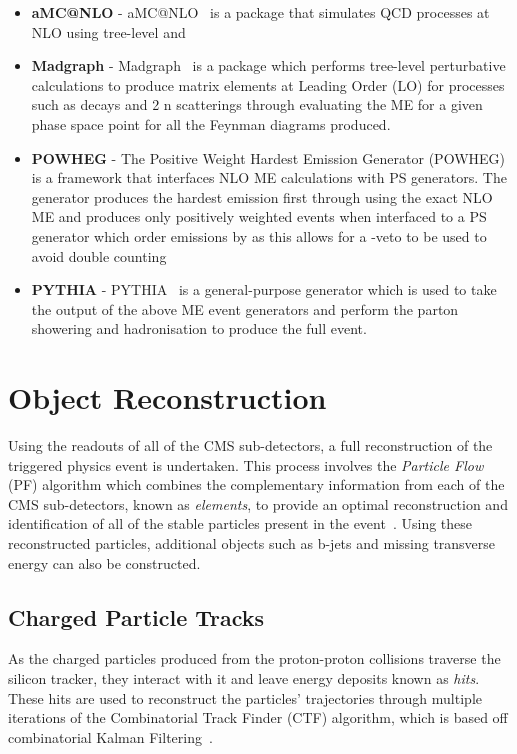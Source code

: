 \begin{itemize}
\item \textbf{aMC@NLO} - aMC@NLO~\cite{Alwall:2014hca} is a package that simulates QCD processes at NLO using tree-level and 	
\item \textbf{Madgraph} - Madgraph~\cite{Alwall:2011uj} is a package which performs tree-level perturbative calculations to produce matrix elements at Leading Order (LO) for processes such as decays and 2 \rightarrow n scatterings through evaluating the ME for a given phase space point for all the Feynman diagrams produced.
\item \textbf{POWHEG} - The Positive Weight Hardest Emission Generator (POWHEG)~\cite{Alioli:2010xd} is a framework that interfaces NLO ME calculations with PS generators.
The generator produces the hardest emission first through using the exact NLO ME and produces only positively weighted events 
when interfaced to a PS generator which order emissions by \pT as this allows for a \pT -veto to be used to avoid double counting 

\item \textbf{PYTHIA} - PYTHIA~\cite{Sjostrand:2014zea} is a general-purpose generator which is used to take the output of the above ME event generators and perform the parton showering and hadronisation to produce the full event.
\end{itemize}


\section{Object Reconstruction}\label{sec:reco}
Using the readouts of all of the CMS sub-detectors, a full reconstruction of the triggered physics event is undertaken.
This process involves the \emph{Particle Flow} (PF) algorithm which combines the complementary information from each of the CMS sub-detectors, known as \emph{elements}, to provide an optimal reconstruction and identification of all of the stable particles present in the event~\cite{CMS:2009nxa,CMS:2010eua,CMS-PRF-14-001}.
Using these reconstructed particles, additional objects such as b-jets and missing transverse energy can also be constructed.

\subsection{Charged Particle Tracks}\label{subsec:tracks}
As the charged particles produced from the proton-proton collisions traverse the silicon tracker, they interact with it and leave energy deposits known as \emph{hits}.
These hits are used to reconstruct the particles' trajectories through multiple iterations of the Combinatorial Track Finder (CTF) algorithm, which is based off combinatorial Kalman Filtering~\cite{Chatrchyan:2014fea,Fruhwirth:1987fm}.

